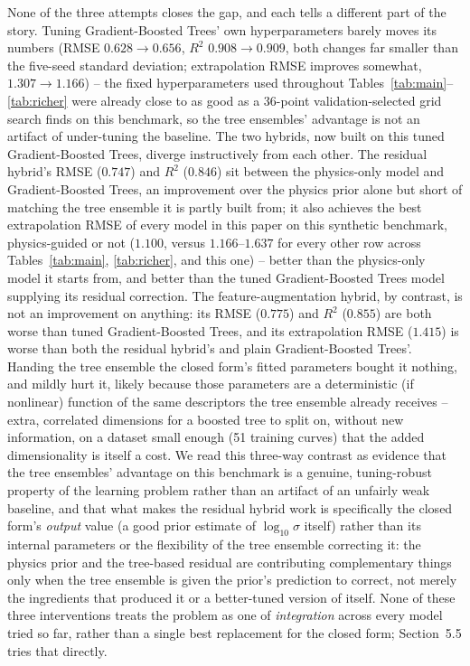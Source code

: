 \documentclass[11pt]{article}
\begin{document}
None of the three attempts closes the gap, and each tells a different part of the story. Tuning Gradient-Boosted Trees' own hyperparameters barely moves its numbers (RMSE $0.628 \to 0.656$, $R^2$ $0.908 \to 0.909$, both changes far smaller than the five-seed standard deviation; extrapolation RMSE improves somewhat, $1.307 \to 1.166$) -- the fixed hyperparameters used throughout Tables~\ref{tab:main}--\ref{tab:richer} were already close to as good as a 36-point validation-selected grid search finds on this benchmark, so the tree ensembles' advantage is not an artifact of under-tuning the baseline. The two hybrids, now built on this tuned Gradient-Boosted Trees, diverge instructively from each other. The residual hybrid's RMSE ($0.747$) and $R^2$ ($0.846$) sit between the physics-only model and Gradient-Boosted Trees, an improvement over the physics prior alone but short of matching the tree ensemble it is partly built from; it also achieves the best extrapolation RMSE of every model in this paper on this synthetic benchmark, physics-guided or not ($1.100$, versus $1.166$--$1.637$ for every other row across Tables~\ref{tab:main}, \ref{tab:richer}, and this one) -- better than the physics-only model it starts from, and better than the tuned Gradient-Boosted Trees model supplying its residual correction. The feature-augmentation hybrid, by contrast, is not an improvement on anything: its RMSE ($0.775$) and $R^2$ ($0.855$) are both worse than tuned Gradient-Boosted Trees, and its extrapolation RMSE ($1.415$) is worse than both the residual hybrid's and plain Gradient-Boosted Trees'. Handing the tree ensemble the closed form's fitted parameters bought it nothing, and mildly hurt it, likely because those parameters are a deterministic (if nonlinear) function of the same descriptors the tree ensemble already receives -- extra, correlated dimensions for a boosted tree to split on, without new information, on a dataset small enough (51 training curves) that the added dimensionality is itself a cost. We read this three-way contrast as evidence that the tree ensembles' advantage on this benchmark is a genuine, tuning-robust property of the learning problem rather than an artifact of an unfairly weak baseline, and that what makes the residual hybrid work is specifically the closed form's \emph{output} value (a good prior estimate of $\log_{10}\sigma$ itself) rather than its internal parameters or the flexibility of the tree ensemble correcting it: the physics prior and the tree-based residual are contributing complementary things only when the tree ensemble is given the prior's prediction to correct, not merely the ingredients that produced it or a better-tuned version of itself. None of these three interventions treats the problem as one of \emph{integration} across every model tried so far, rather than a single best replacement for the closed form; Section~5.5 tries that directly.
\end{document}
